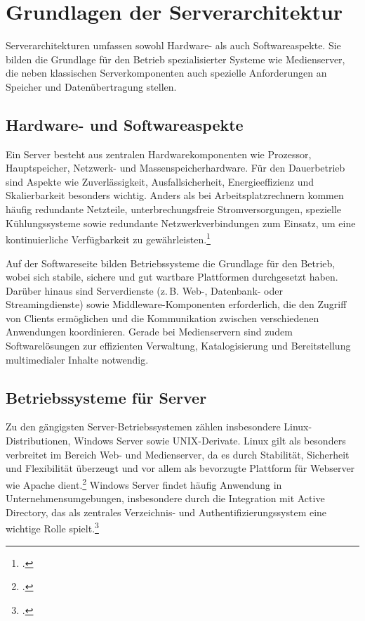 \documentclass[12pt,a4paper]{report}
\begin{document}
\section{Grundlagen der Serverarchitektur}
Serverarchitekturen umfassen sowohl Hardware- als auch Softwareaspekte. 
Sie bilden die Grundlage für den Betrieb spezialisierter Systeme wie Medienserver, 
die neben klassischen Serverkomponenten auch spezielle Anforderungen an Speicher und Datenübertragung stellen.

  \subsection{Hardware- und Softwareaspekte}
  Ein Server besteht aus zentralen Hardwarekomponenten wie Prozessor, Hauptspeicher, Netzwerk- und Massenspeicherhardware. 
  Für den Dauerbetrieb sind Aspekte wie Zuverlässigkeit, Ausfallsicherheit, Energieeffizienz und Skalierbarkeit besonders wichtig. 
  Anders als bei Arbeitsplatzrechnern kommen häufig redundante Netzteile, unterbrechungsfreie Stromversorgungen, 
  spezielle Kühlungssysteme sowie redundante Netzwerkverbindungen zum Einsatz, 
  um eine kontinuierliche Verfügbarkeit zu gewährleisten.\footcite[Vgl.][S.~152541]{ahmed2021energy} 

  Auf der Softwareseite bilden Betriebssysteme die Grundlage für den Betrieb, 
  wobei sich stabile, sichere und gut wartbare Plattformen durchgesetzt haben. 
  Darüber hinaus sind Serverdienste (z.\,B. Web-, Datenbank- oder Streamingdienste) 
  sowie Middleware-Komponenten erforderlich, die den Zugriff von Clients ermöglichen 
  und die Kommunikation zwischen verschiedenen Anwendungen koordinieren. 
  Gerade bei Medienservern sind zudem Softwarelösungen zur effizienten Verwaltung, 
  Katalogisierung und Bereitstellung multimedialer Inhalte notwendig.

  \subsection{Betriebssysteme für Server}
  Zu den gängigsten Server-Betriebssystemen zählen insbesondere 
  Linux-Distributionen, Windows Server sowie \ac{UNIX}-Derivate.
  Linux gilt als besonders verbreitet im Bereich Web- und Medienserver, 
  da es durch Stabilität, Sicherheit und Flexibilität überzeugt und 
  vor allem als bevorzugte Plattform für Webserver wie Apache dient.\footcite[Vgl.][S.~963~ff.]{nemeth_unixlinux} 
  Windows Server findet häufig Anwendung in Unternehmensumgebungen, 
  insbesondere durch die Integration mit Active Directory, 
  das als zentrales Verzeichnis- und Authentifizierungssystem eine 
  wichtige Rolle spielt.\footcite[Vgl.][S.~1154~f.]{nemeth_unixlinux}
\end{document}
